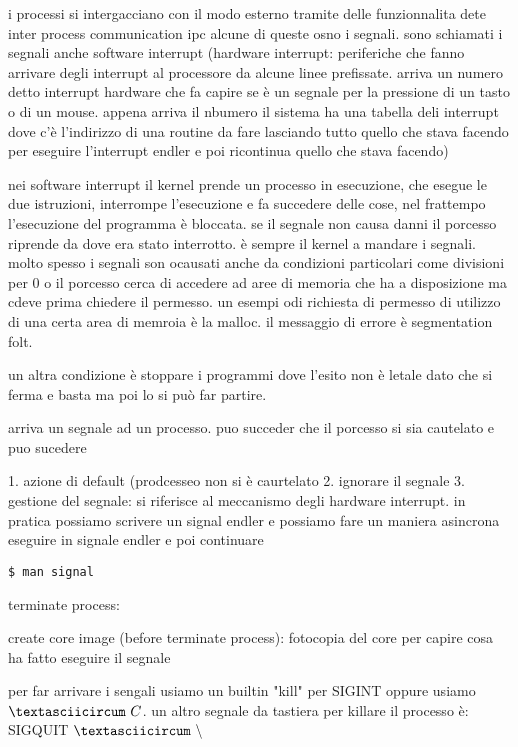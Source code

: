 i processi si intergacciano con il modo esterno tramite delle funzionnalita dete inter process communication ipc alcune di queste osno i segnali. sono schiamati i segnali anche software interrupt (hardware interrupt: periferiche che fanno arrivare degli interrupt al processore da alcune linee prefissate. arriva un numero detto interrupt hardware che fa capire se è un segnale per la pressione di un tasto o di un mouse. appena arriva il nbumero il sistema ha una tabella deli interrupt dove c'è l'indirizzo di una routine da fare lasciando tutto quello che stava facendo per eseguire l'interrupt endler e poi ricontinua quello che stava facendo)


nei software interrupt il kernel prende un processo in esecuzione, che esegue le due istruzioni, interrompe l'esecuzione e fa succedere delle cose, nel frattempo l'esecuzione del programma è bloccata. se il segnale non causa danni il porcesso riprende da dove era stato interrotto. è sempre il kernel a mandare i segnali. molto spesso i segnali son ocausati anche da condizioni particolari come divisioni per 0 o il porcesso cerca di accedere ad aree di memoria che ha a disposizione ma cdeve prima chiedere il permesso. un esempi odi richiesta di permesso di utilizzo di una certa area di memroia è la malloc. il messaggio di errore è segmentation folt.

un altra condizione è stoppare i programmi dove l'esito non è letale dato che si ferma e basta ma poi lo si può far partire.

arriva un segnale ad un processo. puo succeder che il porcesso si sia cautelato e puo sucedere

1. azione di default (prodcesseo non si è caurtelato
2. ignorare il segnale
3. gestione del segnale: si riferisce al meccanismo degli hardware interrupt. in pratica possiamo scrivere un signal endler e possiamo fare un maniera asincrona eseguire in signale endler e poi continuare

\begin{lstlisting}
$ man signal
\end{lstlisting}


terminate process: 

create core image (before terminate process): fotocopia del core per capire cosa ha fatto eseguire il segnale


per far arrivare i sengali usiamo un builtin "kill" per SIGINT oppure usiamo $\textasciicircum\ C$. un altro segnale da tastiera per killare il processo è: SIGQUIT $ \textasciicircum\ \backslash $




